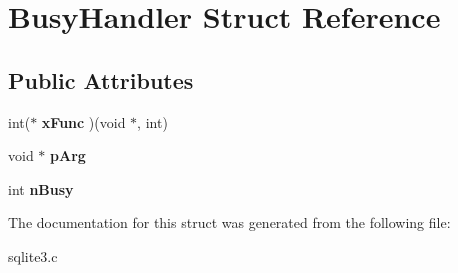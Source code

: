 \hypertarget{struct_busy_handler}{\section{Busy\-Handler Struct Reference}
\label{struct_busy_handler}
}
\subsection*{Public Attributes}
\begin{DoxyCompactItemize}
\item 
\hypertarget{struct_busy_handler_aafc84c4e4934de2d5bdf02f268e9340f}{int($\ast$ {\bfseries x\-Func} )(void $\ast$, int)}\label{struct_busy_handler_aafc84c4e4934de2d5bdf02f268e9340f}

\item 
\hypertarget{struct_busy_handler_a1c793d2b815e79cf3684de46847551bd}{void $\ast$ {\bfseries p\-Arg}}\label{struct_busy_handler_a1c793d2b815e79cf3684de46847551bd}

\item 
\hypertarget{struct_busy_handler_aac4531c677ed5ae9e4757ca1b02c568b}{int {\bfseries n\-Busy}}\label{struct_busy_handler_aac4531c677ed5ae9e4757ca1b02c568b}

\end{DoxyCompactItemize}


The documentation for this struct was generated from the following file\-:\begin{DoxyCompactItemize}
\item 
sqlite3.\-c\end{DoxyCompactItemize}
